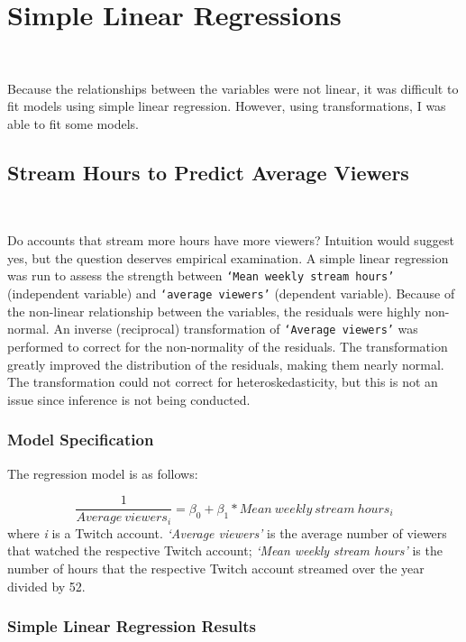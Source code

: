\documentclass[12pt]{article}
\begin{document}
\section{Simple Linear Regressions}\

Because the relationships between the variables were not linear, it was difficult to fit models using simple linear regression. However, using transformations, I was able to fit some models.

\subsection{Stream Hours to Predict Average Viewers}\

Do accounts that stream more hours have more viewers? Intuition would suggest yes, but the question deserves empirical examination. A simple linear regression was run to assess the strength between \texttt{`Mean weekly stream hours’} (independent variable) and \texttt{`average viewers’} (dependent variable). Because of the non-linear relationship between the variables, the residuals were highly non-normal. An inverse (reciprocal) transformation of \texttt{`Average viewers’} was performed to correct for the non-normality of the residuals. The transformation greatly improved the distribution of the residuals, making them nearly normal. The transformation could not correct for heteroskedasticity, but this is not an issue since inference is not being conducted.

\subsubsection{Model Specification}

The regression model is as follows:

\begin{equation}
\dfrac{1}{Average\ viewers_{i}} = \beta_{0} + \beta_{1} \ast Mean\ weekly\ stream\ hours_{i} 
\end{equation}
where \textit{i} is a Twitch account. \textit{`Average viewers'} is the average number of viewers that watched the respective Twitch account; \textit{`Mean weekly stream hours'} is the number of hours that the respective Twitch account streamed over the year divided by 52.

\subsubsection{Simple Linear Regression Results}\
\end{document}

